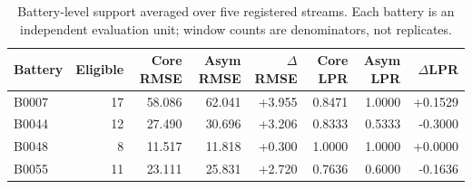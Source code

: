 \begin{table}[H]
\centering
\small
\caption{Battery-level support averaged over five registered streams. Each battery is an independent evaluation unit; window counts are denominators, not replicates.}
\label{tab:supp-battery-units}
\begin{tabular}{@{}lrrrrrrr@{}}
\toprule
Battery & Eligible & Core RMSE & Asym RMSE & $\Delta$RMSE & Core LPR & Asym LPR & $\Delta$LPR \\
\midrule
B0007 & 17 & 58.086 & 62.041 & +3.955 & 0.8471 & 1.0000 & +0.1529 \\
B0044 & 12 & 27.490 & 30.696 & +3.206 & 0.8333 & 0.5333 & -0.3000 \\
B0048 & 8 & 11.517 & 11.818 & +0.300 & 1.0000 & 1.0000 & +0.0000 \\
B0055 & 11 & 23.111 & 25.831 & +2.720 & 0.7636 & 0.6000 & -0.1636 \\
\bottomrule
\end{tabular}
\end{table}
